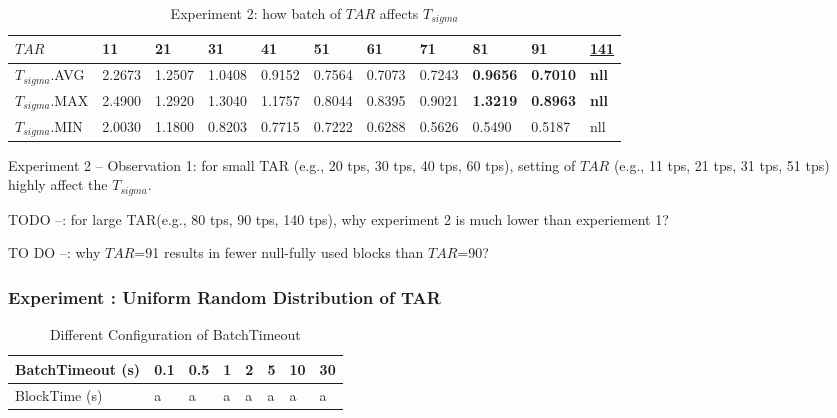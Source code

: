 \documentclass[10pt,journal,compsoc, twoside]{IEEEtran}
\begin{document}
\begin{table*}[htbp]
	\caption{Experiment 2: how batch of $TAR$ affects $T_{sigma}$}
	\begin{tabular}{|l|l|l|l|l|l|l|l|l|l|l|}
		\hline
		$TAR$           & 11     & 21     & 31     & 41     & 51     & 61     & 71     & 81              & 91              & {\underline{141}}    \\ \hline
		$T_{sigma}$.AVG & 2.2673 & 1.2507 & 1.0408 & 0.9152 & 0.7564 & 0.7073 & 0.7243 & \textbf{0.9656} & \textbf{0.7010} & \textbf{nll} \\ \hline
		$T_{sigma}$.MAX & 2.4900 & 1.2920 & 1.3040 & 1.1757 & 0.8044 & 0.8395 & 0.9021 & \textbf{1.3219} & \textbf{0.8963} & \textbf{nll} \\ \hline
		$T_{sigma}$.MIN & 2.0030 & 1.1800 & 0.8203 & 0.7715 & 0.7222 & 0.6288 & 0.5626 & 0.5490          & 0.5187          & nll          \\ \hline
	\end{tabular}
\end{table*}


Experiment 2 -- Observation 1: for small TAR (e.g., 20 tps, 30 tps, 40 tps, 60 tps), setting of $TAR$ (e.g., 11 tps, 21 tps, 31 tps, 51 tps) highly affect the $T_{sigma}$.

TODO --: for large TAR(e.g., 80 tps, 90 tps, 140 tps), why experiment 2 is much lower than experiement 1?

TO DO --: why $TAR$=91 results in fewer null-fully used blocks than $TAR$=90? 







\subsubsection{Experiment : Uniform Random Distribution of TAR}

\begin{table}[htbp]
	\caption{Different Configuration of BatchTimeout}
	\begin{tabular}{|l|l|l|l|l|l|l|l|}
		\hline
		BatchTimeout (s) & 0.1 & 0.5 & 1 & 2 & 5 & 10 & 30 \\ \hline
		BlockTime (s)    & a   & a   & a & a & a & a  & a  \\ \hline
	\end{tabular}
\end{table}
\end{document}
